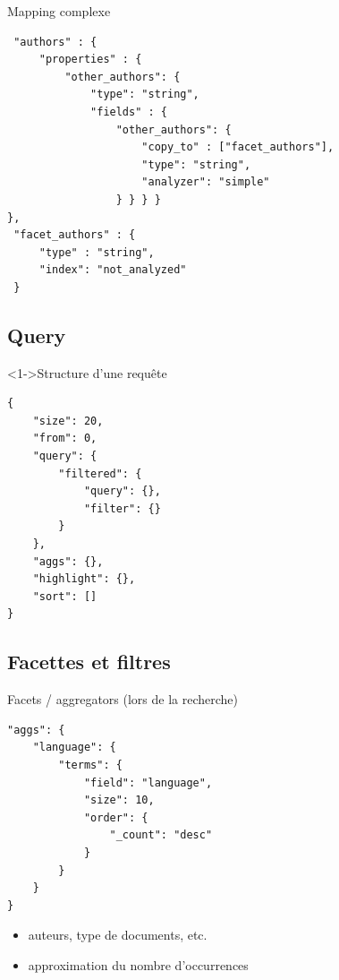 \documentclass[hangout]{beamer}
\begin{document}
\begin{frame}[fragile]
	\begin{block}{Mapping complexe}
		\begin{lstlisting}
 "authors" : {
     "properties" : {
         "other_authors": {
             "type": "string",
             "fields" : {
                 "other_authors": {
                     "copy_to" : ["facet_authors"],
                     "type": "string",
                     "analyzer": "simple"
                 } } } } 
},
 "facet_authors" : {
     "type" : "string",
     "index": "not_analyzed"
 }
		\end{lstlisting}
	\end{block}
\end{frame}

\subsection{Query}
\begin{frame}[fragile]
	\begin{block}<1->{Structure d'une requête}
			\begin{lstlisting}
{
    "size": 20,
    "from": 0,
    "query": {
        "filtered": {
            "query": {},
            "filter": {}
        } 
    },
    "aggs": {},
    "highlight": {},
    "sort": []
}
			\end{lstlisting}
	\end{block}
\end{frame}


\subsection{Facettes et filtres}
\begin{frame}[fragile]
	\begin{block}{Facets / aggregators (lors de la recherche)}
		\begin{lstlisting}
"aggs": {
    "language": {
        "terms": {
            "field": "language",
            "size": 10,
            "order": {
                "_count": "desc"
            }
        }
    }
}
		\end{lstlisting}
		\begin{itemize}
			\item auteurs, type de documents, etc.
			\item approximation du nombre d'occurrences
		\end{itemize}
	\end{block}
\end{frame}
\end{document}
